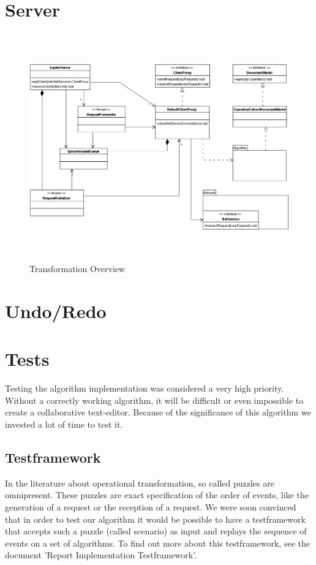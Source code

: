 \section{Server}
\begin{figure}[H]
\centering
\includegraphics[height=9.8cm,width=15.36cm]{../../images/algo-impl/server_diagram.eps}
\caption{Transformation Overview}
\label{Transformation Overview}
\end{figure}


\section{Undo/Redo}



\section{Tests}
Testing the algorithm implementation was considered a very high priority. Without a correctly working algorithm, it will be difficult or even impossible to create a collaborative text-editor. Because of the significance of this algorithm we invested a lot of time to test it.

\subsection{Testframework}
In the literature about operational transformation, so called puzzles are omnipresent. These puzzles are exact specification of the order of events, like the generation of a request or the reception of a request. We were soon convinced that in order to test our algorithm it would be possible to have a testframework that accepts such a puzzle (called scenario) as input and replays the sequence of events on a set of algorithms. To find out more about this testframework, see the document 'Report Implementation Testframework'.

